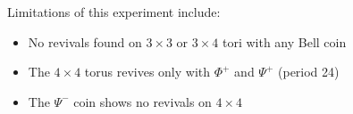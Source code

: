 Limitations of this experiment include:

\begin{itemize}
    \item No revivals found on $3 \times 3$ or $3 \times 4$ tori with
          any Bell coin
    \item The $4 \times 4$ torus revives only with $\Phi^+$ and
          $\Psi^+$ (period 24)
    \item The $\Psi^-$ coin shows no revivals on $4 \times 4$
\end{itemize}
